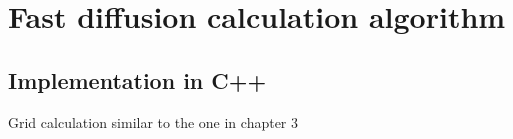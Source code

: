 \documentclass[main]{subfiles}
\begin{document}


\section{Fast diffusion calculation algorithm}\label{sct:algo_diff}

\subsection{Implementation in C++}


Grid calculation similar to the one in chapter 3
\end{document}
